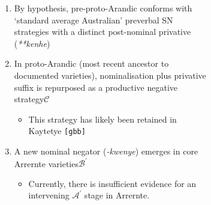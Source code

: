 \begin{figure}[H]
	\caption{Summary of reconstructed changes in the Arandic negative domain in terms of NEC stages $ (\mathcal{A,B,C}) $}\label{arandic}
	\begin{subfigure}{.4\textwidth}
\end{subfigure}
\begin{subfigure}{.68\textwidth}
	\begin{enumerate}[\bf i]
		\item By hypothesis, pre-proto-Arandic conforms with `standard average Australian' preverbal SN strategies with a distinct post-nominal privative (\textit{**kenhe})
		\item In proto-Arandic (most recent ancestor to documented varieties), nominalisation plus privative suffix is repurposed as a productive negative strategy\hfill$\boldsymbol{\mathcal C}$
		\begin{itemize}
			\item This strategy has likely been retained in Kaytetye \texttt{[gbb]}
		\end{itemize}
		\item A new nominal negator (\textit{-kwenye}) emerges in core Arrernte varieties\hfill$\boldsymbol{\mathcal{B^\prime}}$
		\begin{itemize}
			\item Currently, there is insufficient evidence for an intervening $\boldsymbol{\mathcal{A^\prime}}$ stage in Arrernte.
		\end{itemize}	
	\end{enumerate}
\end{subfigure}
\end{figure}

